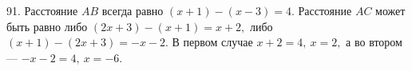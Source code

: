 91. Расстояние $AB$ всегда равно $(x+1)-(x-3)=4.$ Расстояние $AC$ может быть равно либо $(2x+3)-(x+1)=x+2,$ либо $(x+1)-(2x+3)=-x-2.$ В первом случае $x+2=4,\ x=2,$ а во втором --- $-x-2=4,\ x=-6.$\\
